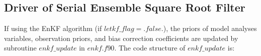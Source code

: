 

\subsection{Driver of Serial Ensemble Square Root Filter} \label{chap5_sec_mvopu}
If using the EnKF algorithm (if $letkf\_flag=.false.$), the priors of model analyses variables, 
observation priors, and bias correction coefficients are updated by subroutine $enkf\_update$ in $enkf.f90$. The code structure of $enkf\_update$ is:

